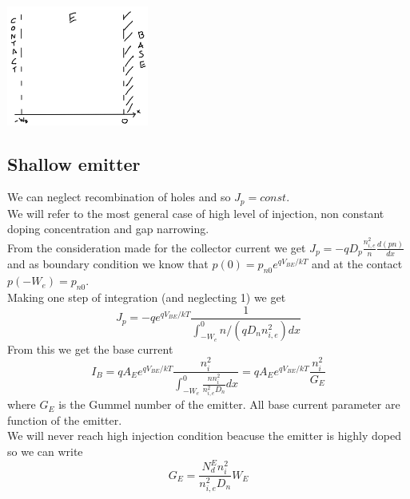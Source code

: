 \centering
\includegraphics[width=0.35\textwidth]{emi.png}\\
\raggedright

\subsection{Shallow emitter}
We can neglect recombination of holes and so $J_p=const$.\\
We will refer to the most general case of high level of injection, non constant doping concentration and gap narrowing.\\
From the consideration made for the collector current we get $J_p=-qD_p \frac{n_{i,e}^2}{n}\frac{d(pn)}{dx}$ and as boundary condition we know that $p(0)=p_{n0}e^{qV_{BE}/kT}$ and at the contact $p(-W_e)=p_{n0}$.\\
Making one step of integration (and neglecting 1) we get 
\begin{equation}
J_p=-qe^{qV_{BE}/kT}\frac{1}{\int_{-W_e}^0 n/(qD_nn_{i,e}^2) dx}
\end{equation}
From this we get the base current
\begin{equation}
I_B= qA_E e^{qV_{BE}/kT}\frac{n_i^2}{\int_{-W_e}^{0}\frac{n n_i^2}{n_{i,e}^2D_n} dx}=qA_Ee^{qV_{BE}/kT}\frac{n_i^2}{G_E}
\end{equation}
where $G_E$ is the Gummel number of the emitter. All base current parameter are function of the emitter.\\
We will never reach high injection condition beacuse the emitter is highly doped so we can write
\begin{equation}
G_E= \frac{N_d^En_i^2}{n_{i,e}^2D_n}W_E
\end{equation}

